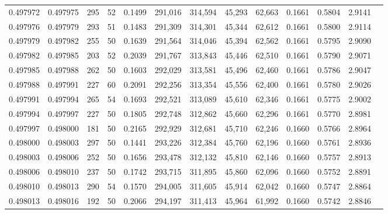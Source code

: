 \begin{tabular}{rrrrrrrrrrrrr}
0.497972 & 0.497975 & 295 &  52 &                                     0.1499 & 291,016 & 314,594 &  45,293 &  62,663 & 0.1661 & 0.5804 & 2.9141 \\
0.497976 & 0.497979 & 293 &  51 &                                     0.1483 & 291,309 & 314,301 &  45,344 &  62,612 & 0.1661 & 0.5800 & 2.9114 \\
0.497979 & 0.497982 & 255 &  50 &                                     0.1639 & 291,564 & 314,046 &  45,394 &  62,562 & 0.1661 & 0.5795 & 2.9090 \\
0.497982 & 0.497985 & 203 &  52 &                                     0.2039 & 291,767 & 313,843 &  45,446 &  62,510 & 0.1661 & 0.5790 & 2.9071 \\
0.497985 & 0.497988 & 262 &  50 &                                     0.1603 & 292,029 & 313,581 &  45,496 &  62,460 & 0.1661 & 0.5786 & 2.9047 \\
0.497988 & 0.497991 & 227 &  60 &                                     0.2091 & 292,256 & 313,354 &  45,556 &  62,400 & 0.1661 & 0.5780 & 2.9026 \\
0.497991 & 0.497994 & 265 &  54 &                                     0.1693 & 292,521 & 313,089 &  45,610 &  62,346 & 0.1661 & 0.5775 & 2.9002 \\
0.497994 & 0.497997 & 227 &  50 &                                     0.1805 & 292,748 & 312,862 &  45,660 &  62,296 & 0.1661 & 0.5770 & 2.8981 \\
0.497997 & 0.498000 & 181 &  50 &                                     0.2165 & 292,929 & 312,681 &  45,710 &  62,246 & 0.1660 & 0.5766 & 2.8964 \\
0.498000 & 0.498003 & 297 &  50 &                                     0.1441 & 293,226 & 312,384 &  45,760 &  62,196 & 0.1660 & 0.5761 & 2.8936 \\
0.498003 & 0.498006 & 252 &  50 &                                     0.1656 & 293,478 & 312,132 &  45,810 &  62,146 & 0.1660 & 0.5757 & 2.8913 \\
0.498006 & 0.498010 & 237 &  50 &                                     0.1742 & 293,715 & 311,895 &  45,860 &  62,096 & 0.1660 & 0.5752 & 2.8891 \\
0.498010 & 0.498013 & 290 &  54 &                                     0.1570 & 294,005 & 311,605 &  45,914 &  62,042 & 0.1660 & 0.5747 & 2.8864 \\
0.498013 & 0.498016 & 192 &  50 &                                     0.2066 & 294,197 & 311,413 &  45,964 &  61,992 & 0.1660 & 0.5742 & 2.8846 \\

\end{tabular}
